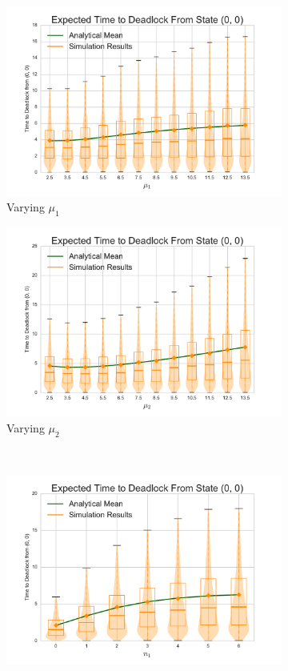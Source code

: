 \documentclass{article}
\begin{document}
\begin{figure}[!htbp]
\begin{center}
\begin{subfigure}[b]{0.35\textwidth}
  \includegraphics[width=\textwidth]{images/vary_mu1fb}
  \caption{Varying $\mu_1$}
  \label{fig:timestodeadlockfb_mu1}
\end{subfigure}
\begin{subfigure}[b]{0.35\textwidth}
  \includegraphics[width=\textwidth]{images/vary_mu2fb}
  \caption{Varying $\mu_2$}
  \label{fig:timestodeadlockfb_mu2}
\end{subfigure}\\
\begin{subfigure}[b]{0.35\textwidth}
  \includegraphics[width=\textwidth]{images/vary_n1fb}

\end{subfigure}
\end{center}
\end{figure}
\end{document}
